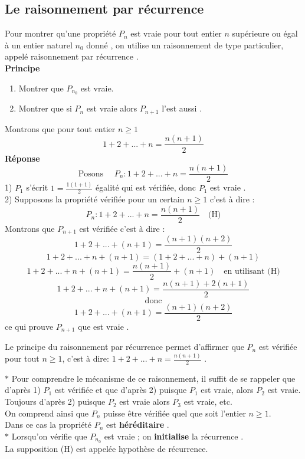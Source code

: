 \subsection{Le raisonnement par récurrence}
Pour montrer qu'une propriété $ P_{n} $ est vraie pour tout entier $ n $ supérieure ou égal à un entier naturel $ n_{0} $ donné , on utilise un raisonnement de type particulier, appelé raisonnement par récurrence .\\
\textbf{Principe}
\begin{enumerate} 
\item  Montrer que $ P_{n_{0}} $  est vraie.
\item  Montrer que si $ P_{n} $ est vraie  alors $ P_{n+1} $ l'est aussi .
 \end{enumerate}
\begin{example}
Montrons que pour tout entier $ n\geq 1 $  \[1+2+ ...+ n = \frac{n(n+1)}{2}\]
\textbf{Réponse} 
  $$ \textrm{Posons } \quad P_{n}: 1+2+ ...+ n = \frac{n(n+1)}{2} $$
1) $ P_{1} $ s'écrit $ 1= \frac{1(1+1)}{2} $  égalité qui est vérifiée, donc $  P_{1} $  est vraie . \\
2) Supposons la propriété vérifiée pour un certain $ n\geq 1 $ c'est à dire :
$$ P_{n}: 1+2+ ...+ n = \frac{n(n+1)}{2} \quad \textrm{(H)}  $$
Montrons que $ P_{n+1} $  est vérifiée c'est à dire :
$$  1+2+ ...+ (n+1 )= \frac{(n+1)(n+2)}{2} $$
 $$  1+2+ ...+ n + (n+1)=( 1+2+ ...+ n )+ (n+1)$$
  $$  1+2+ ...+ n + (n+1)= \frac{n(n+1)}{2}+ (n+1)\quad  \textrm{en utilisant (H)}$$
  $$1+2+ ...+ n + (n+1)= \frac{n(n+1)+2(n+1)}{2}$$   $$\textrm{donc}$$
  $$1+2+ ...+ (n+1 )= \frac{(n+1)(n+2)}{2}$$
  ce qui prouve $ P_{n+1} $ que est vraie .
  \end{example}
  Le principe du raisonnement par récurrence permet d'affirmer que $ P_{n} $ est vérifiée pour tout $ n\geq 1 $, c'est à dire: 
  $ 1+2+ ...+ n = \frac{n(n+1)}{2}$ .
   \begin{remark}
   
  $ \ast $ Pour comprendre le mécanisme de ce raisonnement, il suffit de se rappeler que d'après 1) $ P_{1} $ est vérifiée et que d'après 2) puisque $P_{1}$ est vraie, alors $ P_{2} $ est vraie.\\
Toujours d'après 2) puisque $ P_{2} $ est vraie alors $ P_{3} $ est vraie, etc.\\
On comprend ainsi que $ P_{n} $ puisse être  vérifiée quel que soit l'entier $n\geq 1$.\\ Dans ce cas la propriété $ P_{n}$ est   \textbf{héréditaire }.\\
$ \ast $ Lorsqu'on vérifie que  $ P_{n_{0}} $  est vraie ; on  \textbf{initialise} la récurrence . \\
La supposition  (H) est  appelée hypothèse de récurrence. 
\end{remark}   
